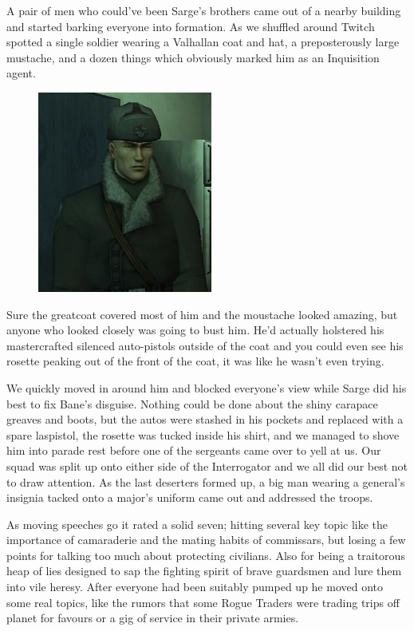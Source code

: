 A pair of men who could've been Sarge's brothers came out of a nearby building and started barking everyone into formation. 
As we shuffled around Twitch spotted a single soldier wearing a Valhallan coat and hat, a preposterously large mustache, and a dozen things which obviously marked him as an Inquisition agent.

\begin{figure}
	\begin{center}
		\includegraphics[width=\figwidth]{pics/9/26.png}
	\end{center}
\end{figure}
Sure the greatcoat covered most of him and the moustache looked amazing, but anyone who looked closely was going to bust him. 
He'd actually holstered his mastercrafted silenced auto-pistols outside of the coat and you could even see his rosette peaking out of the front of the coat, it was like he wasn't even trying. 


We quickly moved in around him and blocked everyone's view while Sarge did his best to fix Bane's disguise. 
Nothing could be done about the shiny carapace greaves and boots, but the autos were stashed in his pockets and replaced with a spare laspistol, the rosette was tucked inside his shirt, and we managed to shove him into parade rest before one of the sergeants came over to yell at us. 
Our squad was split up onto either side of the Interrogator and we all did our best not to draw attention. 
As the last deserters formed up, a big man wearing a general's insignia tacked onto a major's uniform came out and addressed the troops.

As moving speeches go it rated a solid seven; 
hitting several key topic like the importance of camaraderie and the mating habits of commissars, but losing a few points for talking too much about protecting civilians. 
Also for being a traitorous heap of lies designed to sap the fighting spirit of brave guardsmen and lure them into vile heresy. 
After everyone had been suitably pumped up he moved onto some real topics, like the rumors that some Rogue Traders were trading trips off planet for favours or a gig of service in their private armies. 


